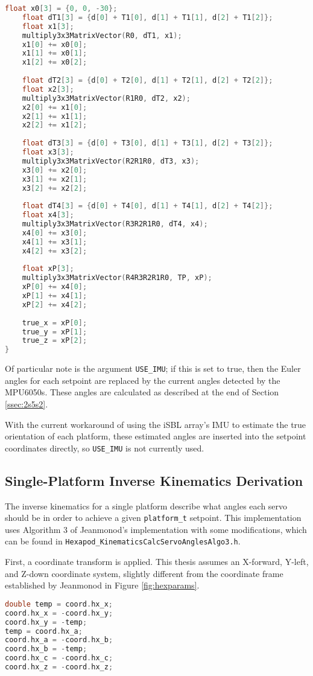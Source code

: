 \documentclass[11pt]{ucthesisCP}
\begin{document}
\begin{lstlisting}[language=C++]
	float x0[3] = {0, 0, -30};
	float dT1[3] = {d[0] + T1[0], d[1] + T1[1], d[2] + T1[2]};
	float x1[3];
	multiply3x3MatrixVector(R0, dT1, x1);
	x1[0] += x0[0];
	x1[1] += x0[1];
	x1[2] += x0[2];
	
	float dT2[3] = {d[0] + T2[0], d[1] + T2[1], d[2] + T2[2]};
	float x2[3];
	multiply3x3MatrixVector(R1R0, dT2, x2);
	x2[0] += x1[0];
	x2[1] += x1[1];
	x2[2] += x1[2];
	
	float dT3[3] = {d[0] + T3[0], d[1] + T3[1], d[2] + T3[2]};
	float x3[3];
	multiply3x3MatrixVector(R2R1R0, dT3, x3);
	x3[0] += x2[0];
	x3[1] += x2[1];
	x3[2] += x2[2];
	
	float dT4[3] = {d[0] + T4[0], d[1] + T4[1], d[2] + T4[2]};
	float x4[3];
	multiply3x3MatrixVector(R3R2R1R0, dT4, x4);
	x4[0] += x3[0];
	x4[1] += x3[1];
	x4[2] += x3[2];
	
	float xP[3];
	multiply3x3MatrixVector(R4R3R2R1R0, TP, xP);
	xP[0] += x4[0];
	xP[1] += x4[1];
	xP[2] += x4[2];
	
	true_x = xP[0];
	true_y = xP[1];
	true_z = xP[2];
}
\end{lstlisting}

Of particular note is the argument \verb|USE_IMU|; if this is set to true, then the Euler angles for each setpoint are replaced by the current angles detected by the MPU6050s. These angles are calculated as described at the end of Section \ref{ssec:2s5s2}.

With the current workaround of using the iSBL array’s IMU to estimate the true orientation of each platform, these estimated angles are inserted into the setpoint coordinates directly, so \verb|USE_IMU| is not currently used.

\subsection{Single-Platform Inverse Kinematics Derivation} \label{ssec:2s5s5}
The inverse kinematics for a single platform describe what angles each servo should be in order to achieve a given \verb|platform_t| setpoint. This implementation uses Algorithm 3 of Jeanmonod’s implementation \cite{nichub} with some modifications, which can be found in \verb|Hexapod_KinematicsCalcServoAnglesAlgo3.h|.

First, a coordinate transform is applied. This thesis assumes an X-forward, Y-left, and Z-down coordinate system, slightly different from the coordinate frame established by Jeanmonod in Figure \ref{fig:hexparams}.

\begin{lstlisting}[language=C++]
double temp = coord.hx_x;
coord.hx_x = -coord.hx_y;
coord.hx_y = -temp;
temp = coord.hx_a;
coord.hx_a = -coord.hx_b;
coord.hx_b = -temp;
coord.hx_c = -coord.hx_c;
coord.hx_z = -coord.hx_z;
\end{lstlisting}
\end{document}

